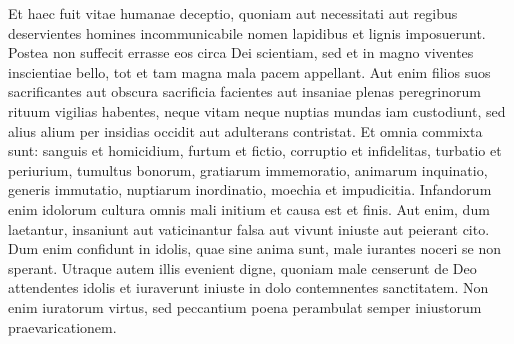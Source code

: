 \begin{biblechapter}
\verse Et haec fuit vitae humanae deceptio, quoniam aut necessitati aut regibus deservientes homines incommunicabile nomen lapidibus et lignis imposuerunt. 
\verse Postea non suffecit errasse eos circa Dei scientiam, sed et in magno viventes inscientiae bello, tot et tam magna mala pacem appellant. 
\verse Aut enim filios suos sacrificantes aut obscura sacrificia facientes aut insaniae plenas peregrinorum rituum vigilias habentes, 
\verse neque vitam neque nuptias mundas iam custodiunt, sed alius alium per insidias occidit aut adulterans contristat. 
\verse Et omnia commixta sunt: sanguis et homicidium, furtum et fictio, corruptio et infidelitas, turbatio et periurium, 
\verse tumultus bonorum, gratiarum immemoratio, animarum inquinatio, generis immutatio, nuptiarum inordinatio, moechia et impudicitia. 
\verse Infandorum enim idolorum cultura omnis mali initium et causa est et finis. 
\verse Aut enim, dum laetantur, insaniunt aut vaticinantur falsa aut vivunt iniuste aut peierant cito. 
\verse Dum enim confidunt in idolis, quae sine anima sunt, male iurantes noceri se non sperant. 
\verse Utraque autem illis evenient digne, quoniam male censerunt de Deo attendentes idolis et iuraverunt iniuste in dolo contemnentes sanctitatem. 
\verse Non enim iuratorum virtus, sed peccantium poena perambulat semper iniustorum praevaricationem. 
\end{biblechapter}

